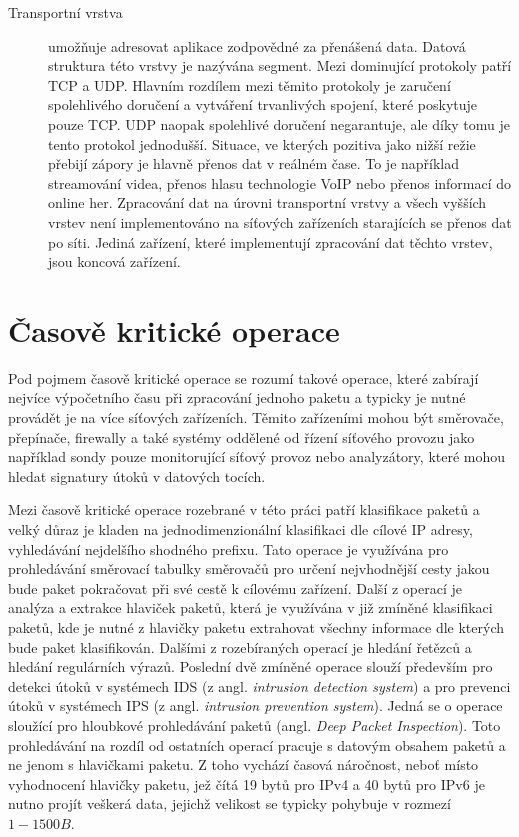 \begin{description}
\item[Transportní vrstva]\label{layers:transport} %
umožňuje adresovat aplikace zodpovědné za přenášená data. Datová struktura této vrstvy
je nazývána segment. Mezi dominující protokoly patří TCP a UDP. Hlavním rozdílem mezi těmito protokoly
je zaručení spolehlivého doručení a vytváření trvanlivých spojení, které poskytuje pouze TCP.
UDP naopak spolehlivé doručení negarantuje, ale díky tomu je tento protokol jednodušší.
Situace, ve kterých pozitiva jako
nižší režie přebijí zápory je hlavně přenos dat v reálném čase. To je například streamování videa,
přenos hlasu technologie VoIP nebo přenos informací do online her.
Zpracování dat na úrovni transportní vrstvy a všech vyšších vrstev není implementováno na síťových
zařízeních starajících se přenos dat po síti. Jediná zařízení, které implementují zpracování
dat těchto vrstev, jsou koncová zařízení.

\end{description}

\section{Časově kritické operace} %
Pod pojmem časově kritické operace se rozumí takové operace, které zabírají nejvíce výpočetního
času při zpracování jednoho paketu a typicky je nutné provádět je na více síťových zařízeních.
Těmito zařízeními mohou být směrovače, přepínače, firewally a také systémy
oddělené od řízení síťového provozu jako například sondy pouze monitorující síťový provoz nebo analyzátory,
které mohou hledat signatury útoků v datových tocích.

Mezi časově kritické operace rozebrané v této práci patří klasifikace paketů a velký důraz je kladen na
jednodimenzionální klasifikaci dle cílové IP adresy, vyhledávání nejdelšího shodného prefixu.
Tato operace je využívána pro prohledávání směrovací tabulky směrovačů pro určení nejvhodnější cesty jakou
bude paket pokračovat při své cestě k cílovému zařízení.
Další z operací je analýza a extrakce hlaviček paketů, která je využívána v již zmíněné klasifikaci paketů,
kde je nutné z hlavičky paketu extrahovat všechny informace dle kterých bude paket klasifikován.
Dalšími z rozebíraných operací je hledání řetězců a hledání regulárních výrazů.
Poslední dvě zmíněné operace slouží především pro detekci útoků v systémech IDS (z angl. \textit{intrusion detection system})
a pro prevenci útoků v systémech IPS (z angl. \textit{intrusion prevention system}). Jedná se o operace sloužící
pro hloubkové prohledávání paketů (angl. \textit{Deep Packet Inspection}). Toto prohledávání na rozdíl od ostatních operací
pracuje s datovým obsahem paketů a ne jenom s hlavičkami paketu. Z toho vychází časová náročnost,
neboť místo vyhodnocení hlavičky paketu, jež čítá 19 bytů pro IPv4 a 40 bytů pro IPv6 je nutno
projít veškerá data, jejichž velikost se typicky pohybuje v rozmezí $1 - 1500B$.

